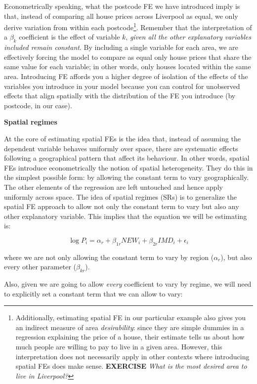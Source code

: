 \documentclass[
]{book}
\begin{document}
Econometrically speaking, what the postcode FE we have introduced imply is that, instead of comparing all house prices across Liverpool as equal, we only derive variation from within each postcode\footnote{Additionally, estimating spatial FE in our particular example also gives you an indirect measure of area \emph{desirability}: since they are simple dummies in a regression explaining the price of a house, their estimate tells us about how much people are willing to pay to live in a given area. However, this interpretation does not necessarily apply in other contexts where introducing spatial FEs does make sense. \textbf{EXERCISE} \emph{What is the most desired area to live in Liverpool?}}. Remember that the interpretation of a \(\beta_k\) coefficient is the effect of variable \(k\), \emph{given all the other explanatory variables included remain constant}. By including a single variable for each area, we are effectively forcing the model to compare as equal only house prices that share the same value for each variable; in other words, only houses located within the same area. Introducing FE affords you a higher degree of isolation of the effects of the variables you introduce in your model because you can control for unobserved effects that align spatially with the distribution of the FE you introduce (by postcode, in our case).

\textbf{Spatial regimes}

At the core of estimating spatial FEs is the idea that, instead of assuming the dependent variable behaves uniformly over space, there are systematic effects following a geographical pattern that affect its behaviour. In other words, spatial FEs introduce econometrically the notion of spatial heterogeneity. They do this in the simplest possible form: by allowing the constant term to vary geographically. The other elements of the regression are left untouched and hence apply uniformly across space. The idea of spatial regimes (SRs) is to generalize the spatial FE approach to allow not only the constant term to vary but also any other explanatory variable. This implies that the equation we will be estimating is:

\[
\log{P_i} = \alpha_r + \beta_{1r} NEW_i + \beta_{2r} IMD_i + \epsilon_i
\]

where we are not only allowing the constant term to vary by region (\(\alpha_r\)), but also every other parameter (\(\beta_{kr}\)).

Also, given we are going to allow \emph{every} coefficient to vary by regime, we will need to explicitly set a constant term that we can allow to vary:
\end{document}
